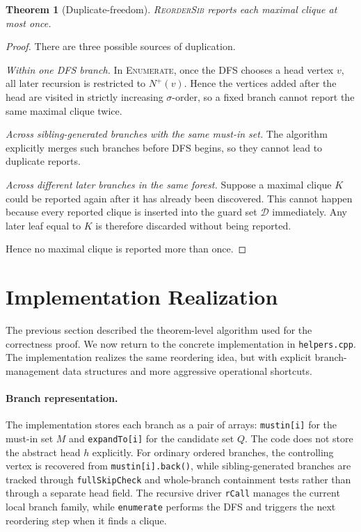 \documentclass[sigconf, nonacm]{acmart}
\newtheorem{theorem}{Theorem}[section]
\theoremstyle{definition}
\theoremstyle{remark}
\begin{document}
\begin{theorem}[Duplicate-freedom]\label{thm:unique}
\textsc{ReorderSib} reports each maximal clique at most once.
\end{theorem}

\begin{proof}
There are three possible sources of duplication.

\emph{Within one DFS branch.}  In \textsc{Enumerate}, once the DFS chooses a
head vertex $v$, all later recursion is restricted to $N^+(v)$.  Hence the
vertices added after the head are visited in strictly increasing $\sigma$-order,
so a fixed branch cannot report the same maximal clique twice.

\emph{Across sibling-generated branches with the same must-in set.}  The
algorithm explicitly merges such branches before DFS begins, so they cannot lead
to duplicate reports.

\emph{Across different later branches in the same forest.}  Suppose a maximal
clique $K$ could be reported again after it has already been discovered.  This
cannot happen because every reported clique is inserted into the guard set
$\mathcal{D}$ immediately.  Any later leaf equal to $K$ is therefore discarded
without being reported.

Hence no maximal clique is reported more than once.
\end{proof}

\section{Implementation Realization}
\label{sec:implementation}

The previous section described the theorem-level algorithm used for the
correctness proof.  We now return to the concrete implementation in
\texttt{helpers.cpp}.  The implementation realizes the same reordering idea,
but with explicit branch-management data structures and more aggressive
operational shortcuts.

\paragraph{Branch representation.}
The implementation stores each branch as a pair of arrays:
\texttt{mustin[i]} for the must-in set $M$ and \texttt{expandTo[i]} for the
candidate set $Q$.  The code does not store the abstract head $h$ explicitly.
For ordinary ordered branches, the controlling vertex is recovered from
\texttt{mustin[i].back()}, while sibling-generated branches are tracked through
\texttt{fullSkipCheck} and whole-branch containment tests rather than through a
separate head field.  The recursive driver \texttt{rCall} manages the current
local branch family, while \texttt{enumerate} performs the DFS and triggers the
next reordering step when it finds a clique.
\end{document}
